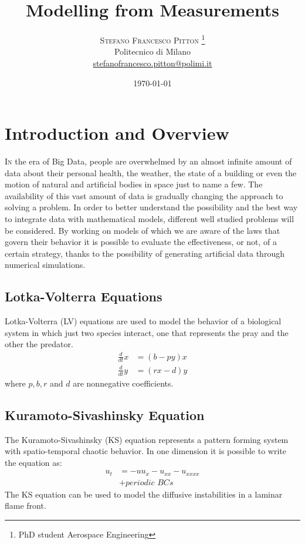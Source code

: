 \documentclass[]{article}
\title{Modelling from Measurements} %
\author{%
\textsc{Stefano Francesco Pitton
\thanks{PhD student Aerospace Engineering}} \\[1ex] %
\normalsize Politecnico di Milano \\ %
\normalsize \href{stefanofrancesco.pitton@polimi.it}{stefanofrancesco.pitton@polimi.it} %
}
\date{\today} %
\begin{document}
\maketitle

\section{Introduction and Overview}
\lettrine[nindent=0em,lines=3]{I}n the era of Big Data, people are overwhelmed by an almost infinite amount of data about their personal health, the weather, the state of a building or even the motion of natural and artificial bodies in space just to name a few. The availability of this vast amount of data is gradually changing the approach to solving a problem. In order to better understand the possibility and the best way to integrate data with mathematical models, different well studied problems will be considered. By working on models of which we are aware of the laws that govern their behavior it is possible to evaluate the effectiveness, or not, of a certain strategy, thanks to the possibility of generating artificial data through numerical simulations.

\subsection{Lotka-Volterra Equations}
Lotka-Volterra (LV) equations are used to model the behavior of a biological system in which just two species interact, one that represents the pray and the other the predator.
\begin{equation}
\begin{aligned}
\frac{d}{dt}x &= (b - py) x \\
\frac{d}{dt}y &= (rx - d) y
\end{aligned}
\end{equation}
where $p, b, r$ and $d$ are nonnegative coefficients.

\subsection{Kuramoto-Sivashinsky Equation}
The Kuramoto-Sivashinsky (KS) equation represents a pattern forming system with spatio-temporal chaotic behavior. In one dimension it is possible to write the equation as:
\begin{equation}\label{ks}
\begin{aligned}
u_t &= -uu_x - u_{xx} - u_{xxxx}  \\
&+ \textit{periodic BCs}
\end{aligned}
\end{equation}
The KS equation can be used to model the diffusive instabilities in a laminar flame front.
\end{document}
